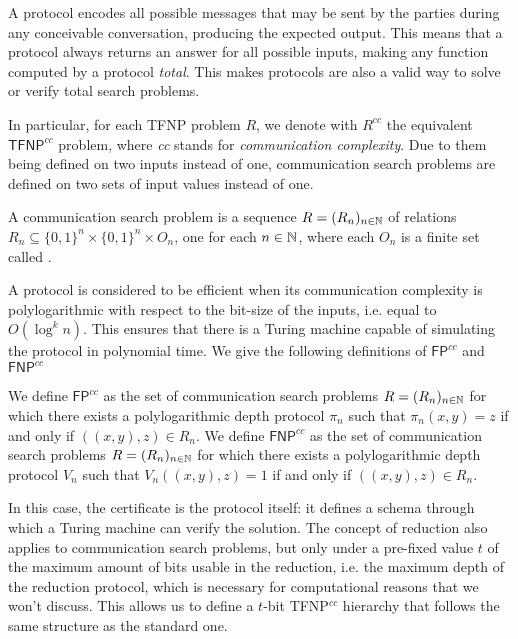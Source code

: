 A protocol encodes all possible messages that may be sent by the parties during any conceivable conversation, producing the expected output. This means that a protocol always returns an answer for all possible inputs, making any function computed by a protocol \textit{total}. This makes protocols are also a valid way to solve or verify total search problems.

In particular, for each \textsf{TFNP} problem $R$, we denote with $R^{cc}$ the equivalent $\mathsf{TFNP}^{cc}$ problem, where \textit{cc} stands for \textit{communication complexity}. Due to them being defined on two inputs instead of one, communication search problems are defined on two sets of input values instead of one.

\begin{definition}
 A communication search problem is a sequence $R = (R_n)_{n \in \mathbb{N}}$ of relations $R_n \subseteq \{0,1\}^n \times \{0,1\}^n \times O_n$, one for each $n \in \mathbb{N}$, where each $O_n$ is a finite set called .
\end{definition}

A protocol is considered to be efficient when its communication complexity is polylogarithmic with respect to the bit-size of the inputs, i.e. equal to $O(\log^k n)$. This ensures that there is a Turing machine capable of simulating the protocol in polynomial time. We give the following definitions of $\mathsf{FP}^{cc}$ and $\mathsf{FNP}^{cc}$

\begin{definition}
 We define $\mathsf{FP}^{cc}$ as the set of communication search problems $R = (R_n)_{n \in \mathbb{N}}$ for which there exists a polylogarithmic depth protocol $\pi_n$ such that $\pi_n(x,y) = z$ if and only if $((x,y), z) \in R_n$. We define $\mathsf{FNP}^{cc}$ as the set of communication search problems $R = (R_n)_{n \in \mathbb{N}}$ for which there exists a polylogarithmic depth protocol $V_n$ such that $V_n((x,y), z) = 1$ if and only if $((x,y), z) \in R_n$. 
\end{definition}

In this case, the certificate is the protocol itself: it defines a schema through which a Turing machine can verify the solution. The concept of reduction also applies to communication search problems, but only under a pre-fixed value $t$ of the maximum amount of bits usable in the reduction, i.e. the maximum depth of the reduction protocol, which is necessary for computational reasons that we won't discuss. This allows us to define a $t$-bit \textsf{TFNP}$^{cc}$ hierarchy that follows the same structure as the standard one.


